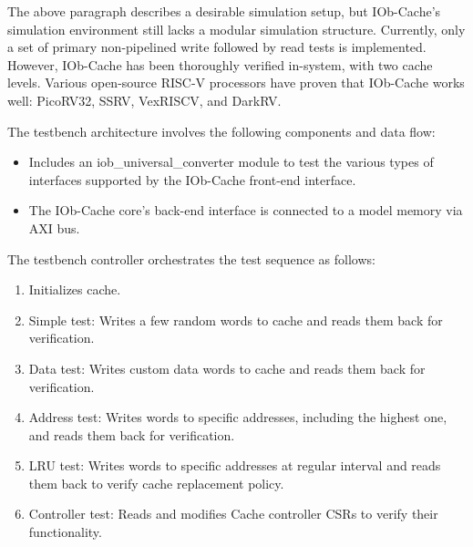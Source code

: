 %

The above paragraph describes a desirable simulation setup, but IOb-Cache's
simulation environment still lacks a modular simulation structure. Currently,
only a set of primary non-pipelined write followed by read tests is
implemented. However, IOb-Cache has been thoroughly verified in-system, with two
cache levels. Various open-source RISC-V processors have proven that IOb-Cache
works well: PicoRV32, SSRV, VexRISCV, and DarkRV.

The testbench architecture involves the following components and data flow:

\begin{itemize}
  \item Includes an iob\_universal\_converter module to test the various types of interfaces supported by the IOb-Cache front-end interface.
  \item The IOb-Cache core's back-end interface is connected to a model memory via AXI bus.
\end{itemize}

The testbench controller orchestrates the test sequence as follows:

\begin{enumerate}
  \item Initializes cache.
  \item Simple test: Writes a few random words to cache and reads them back for verification. %
  \item Data test: Writes custom data words to cache and reads them back for verification. %
  \item Address test: Writes words to specific addresses, including the highest one, and reads them back for verification. %
  \item LRU test: Writes words to specific addresses at regular interval and reads them back to verify cache replacement policy. %
  \item Controller test: Reads and modifies Cache controller CSRs to verify their functionality. %
\end{enumerate}
